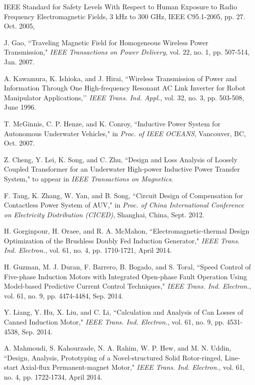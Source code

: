 \documentclass[twocolumn,10pt]{IEEEtran}
\begin{document}
\begin{thebibliography}{99}
IEEE Standard for Safety Levels With Respect to Human Exposure to Radio Frequency Electromagnetic Fields, 3 kHz to 300 GHz, IEEE C95.1-2005, pp. 27. Oct. 2005, 



J. Gao, ``Traveling Magnetic Field for Homogeneous Wireless Power Transmission," \emph{IEEE Transactions on Power Delivery}, vol. 22, no. 1,	pp. 507-514, Jan. 2007.

A. Kawamura, K. Ishioka, and J. Hirai, ``Wireless Transmission of Power and Information Through One High-frequency
Resonant AC Link Inverter for Robot Manipulator Applications,’’ \emph{IEEE Trans. Ind. Appl.}, vol. 32, no. 3, pp. 503-508, June 1996.

 T. McGinnis, C. P. Henze, and K. Conroy, ``Inductive Power System for Autonomous Underwater Vehicles," in \emph{Proc. of IEEE OCEANS}, Vancouver, BC, Oct. 2007.
 
 Z. Cheng, Y. Lei, K. Song, and C. Zhu, ``Design and Loss Analysis of Loosely Coupled Transformer for an Underwater High-power Inductive Power Transfer System," to appear in \emph{IEEE Transactions on Magnetics}.

 F. Tang, K. Zhang, W. Yan, and B. Song, ``Circuit Design of Compensation for Contactless Power System of AUV," in \emph{Proc. of China International Conference on Electricity Distribution (CICED)}, Shanghai, China,  Sept. 2012.

  H. Gorginpour, H. Oraee, and R. A. McMahon, ``Electromagnetic-thermal Design Optimization of the Brushless Doubly Fed Induction Generator," \emph{IEEE Trans. Ind. Electron.}, vol. 61, no. 4, pp. 1710-1721, April 2014.
  	
 

  H. Guzman, M. J. Duran, F. Barrero, B. Bogado, and S. Toral, ``Speed Control of Five-phase Induction Motors with Integrated Open-phase Fault Operation Using Model-based Predictive Current Control Techniques," \emph{IEEE Trans. Ind. Electron.}, vol. 61, no. 9, pp. 4474-4484, Sep. 2014.

  Y. Liang, Y. Hu, X. Liu, and C. Li, ``Calculation and Analysis of Can Losses of Canned Induction Motor," \emph{IEEE Trans. Ind. Electron.}, vol. 61, no. 9, pp. 4531-4538, Sep. 2014.

  A. Mahmoudi, S. Kahourzade, N. A. Rahim, W. P. Hew, and M. N. Uddin, ``Design, Analysis, Prototyping of a Novel-structured Solid Rotor-ringed, Line-start Axial-flux Permanent-magnet Motor," \emph{IEEE Trans. Ind. Electron.}, vol. 61, no. 4, pp. 1722-1734, April 2014.


\end{thebibliography}
\end{document}
